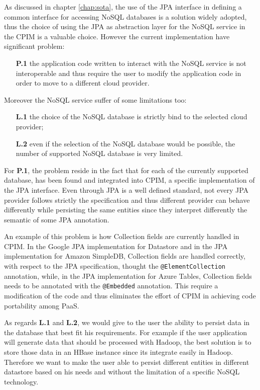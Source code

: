 \newparagraph As discussed in chapter \ref{chap:sota}, the use of the JPA interface in defining a common interface for accessing NoSQL databases is a solution widely adopted, thus the choice of using the JPA as abstraction layer for the NoSQL service in the CPIM is a valuable choice. 
However the current implementation have significant problem:
\begin{enumerate}
\item[\textbf{P.1}] the application code written to interact with the NoSQL service is not interoperable and thus require the user to modify the application code in order to move to a different cloud provider.  
\end{enumerate}
\noindent Moreover the NoSQL service suffer of some limitations too:
\begin{enumerate}
\item[\textbf{L.1}] the choice of the NoSQL database is strictly bind to the selected cloud provider; 
\item[\textbf{L.2}] even if the selection of the NoSQL database would be possible, the number of supported NoSQL database is very limited.
\end{enumerate}

\noindent For \textbf{P.1}, the problem reside in the fact that for each of the currently supported database, has been found and integrated into CPIM, a specific implementation of the JPA interface. Even through JPA is a well defined standard, not every JPA provider follows strictly the specification and thus different provider can behave differently while persisting the same entities since they interpret differently the semantic of some JPA annotation.

\noindent An example of this problem is how Collection fields are currently handled in CPIM. In the Google JPA implementation for Datastore and in the JPA implementation for Amazon SimpleDB, Collection fields are handled correctly, with respect to the JPA specification, thought the \texttt{@ElementCollection} annotation, while, in the JPA implementation for Azure Tables, Collection fields needs to be annotated with the \texttt{@Embedded} annotation. This require a modification of the code and thus eliminates the effort of CPIM in achieving code portability among PaaS.

\newparagraph As regards \textbf{L.1} and \textbf{L.2}, we would give to the user the ability to persist data in the database that best fit his requirements. For example if the user application will generate data that should be processed with Hadoop, the best solution is to store those data in an HBase instance since its integrate easily in Hadoop. Therefore we want to make the user able to persist different entities in different datastore based on his needs and without the limitation of a specific NoSQL technology.

